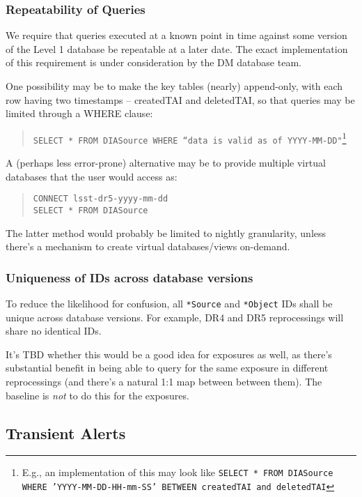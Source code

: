 \documentclass[12pt]{article}
\newcommand{\DB}{{Level 1 database}\xspace}
\begin{document}
\subsubsection{Repeatability of Queries}

We require that queries executed at a known point in time against some version of the \DB be repeatable at a later date. The exact implementation of this requirement is under consideration by the DM database team.

One possibility may be to make the key tables (nearly) append-only, with each row having two timestamps -- createdTAI and deletedTAI, so that queries may be limited through a WHERE clause:

\begin{quote}
\texttt{SELECT * FROM DIASource WHERE ``data is valid as of YYYY-MM-DD"}\footnote{E.g., an implementation of this may look like \texttt{SELECT * FROM DIASource WHERE 'YYYY-MM-DD-HH-mm-SS' BETWEEN createdTAI and deletedTAI}}
\end{quote}

A (perhaps less error-prone) alternative may be to provide multiple virtual databases that the user would access as:

\begin{quote}
\texttt{CONNECT lsst-dr5-yyyy-mm-dd} \\
\texttt{SELECT * FROM DIASource}
\end{quote}

The latter method would probably be limited to nightly granularity, unless there's a mechanism to create virtual databases/views on-demand.

\subsubsection{Uniqueness of IDs across database versions}

To reduce the likelihood for confusion, all \texttt{*Source} and \texttt{*Object}  IDs shall be unique across database versions. For example, DR4 and DR5 reprocessings will share no identical IDs.

It's TBD whether this would be a good idea for exposures as well, as there's substantial benefit in being able to query for the same exposure in different reprocessings (and there's a natural 1:1 map between between them). The baseline is {\em not} to do this for the exposures.

\subsection{Transient Alerts}
\label{sec:voEventContents}
\end{document}
